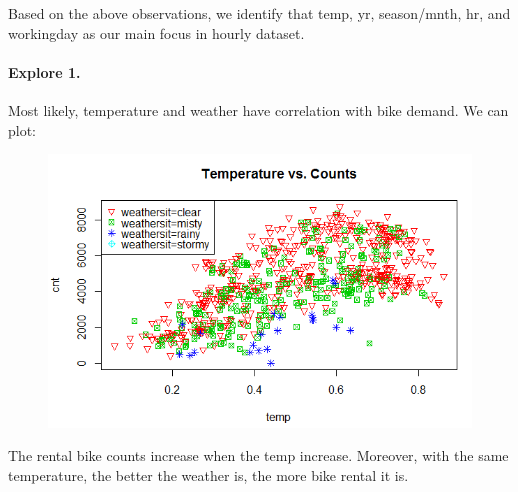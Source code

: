 \documentclass[12pt]{article}
\begin{document}
	Based on the above observations, we identify that temp, yr, season/mnth, hr, and workingday as our main focus in hourly dataset.
	
	\paragraph*{Explore 1.} Most likely, temperature and weather have correlation with bike demand. We can plot:
	\begin{figure}[H]
		\centering
		\includegraphics[scale=.85]{figures/temp_counts.png}
	\end{figure}
	
	The rental bike counts increase when the temp increase. Moreover, with the same temperature, the better the weather is, the more bike rental it is.
	
\end{document}
